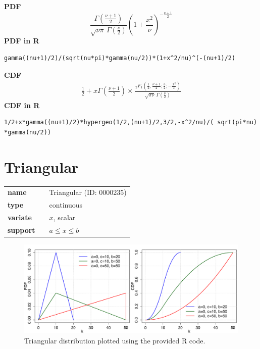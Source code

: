 \documentclass{article}
\begin{document}
\smallskip \noindent \hspace{.2cm} \textbf{PDF} 
\begin{equation*}\frac{\Gamma \left(\frac{\nu+1}{2} \right)} {\sqrt{\nu\pi}\,\Gamma \left(\frac{\nu}{2} \right)} \left(1+\frac{x^2}{\nu} \right)^{-\frac{\nu+1}{2}}\end{equation*}
\smallskip \noindent \hspace{.2cm} \textbf{PDF in R}  
\begin{verbatim}gamma((nu+1)/2)/(sqrt(nu*pi)*gamma(nu/2))*(1+x^2/nu)^(-(nu+1)/2)\end{verbatim}
\smallskip \noindent \hspace{.2cm} \textbf{CDF} 
\begin{equation*}\begin{matrix}
     \frac{1}{2} + x \Gamma \left( \frac{\nu+1}{2} \right)  \times
     \frac{\,_2F_1 \left ( \frac{1}{2},\frac{\nu+1}{2};\frac{3}{2};
           -\frac{x^2}{\nu} \right)}
     {\sqrt{\pi\nu}\,\Gamma \left(\frac{\nu}{2}\right)}
     \end{matrix}\end{equation*}
\smallskip \noindent \hspace{.2cm} \textbf{CDF in R} 
\begin{verbatim}1/2+x*gamma((nu+1)/2)*hypergeo(1/2,(nu+1)/2,3/2,-x^2/nu)/( sqrt(pi*nu) *gamma(nu/2))\end{verbatim}
\smallskip\section*{Triangular} 

  \bigskip 

\begin{tabular}{p{2cm}cl}
\textbf{name} & & Triangular (ID: 0000235)\\ 
 
\textbf{type} & & continuous \\ 

\textbf{variate} & & $x$, scalar \\ 

\textbf{support} & & $a \leq x \leq b$
\end{tabular}

\begin{figure}[ht!]
\centering
  \includegraphics[width=140mm]{pics/Triangular.pdf}
 \caption{Triangular distribution plotted using the provided R code.}
 \label{fig:Triangular}
\end{figure}
\end{document}
